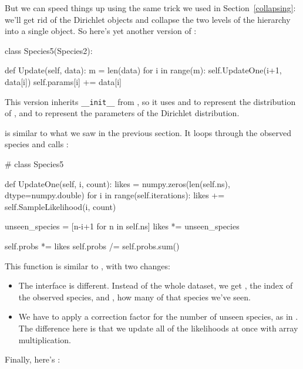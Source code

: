\documentclass[12pt]{book}
\theoremstyle{exercise}
\begin{document}
But we can speed things up using the same trick we used in
Section~\ref{collapsing}: we'll get rid of the Dirichlet objects and
collapse the two levels of the hierarchy into a single object.  So
here's yet another version of :

\begin{code}
class Species5(Species2):
    
    def Update(self, data):
        m = len(data)
        for i in range(m):
            self.UpdateOne(i+1, data[i])
            self.params[i] += data[i]
\end{code}

This version inherits \verb"__init__" from , so
it uses  and  to represent the distribution
of , and  to represent the parameters of
the Dirichlet distribution.

 is similar to what we saw in the previous section.
It loops through the observed species and calls :

\begin{code}
# class Species5

    def UpdateOne(self, i, count):
        likes = numpy.zeros(len(self.ns), dtype=numpy.double)
        for i in range(self.iterations):
            likes += self.SampleLikelihood(i, count)

        unseen_species = [n-i+1 for n in self.ns]
        likes *= unseen_species

        self.probs *= likes
        self.probs /= self.probs.sum()
\end{code}

This function is similar to , with two changes:

\begin{itemize}

\item The interface is different.  Instead of the whole dataset, we
  get , the index of the observed species, and ,
  how many of that species we've seen.

\item We have to apply a correction factor for the number of unseen
  species, as in .  The difference here is
  that we update all of the likelihoods at once with array
  multiplication.

\end{itemize}

Finally, here's :
\end{document}
